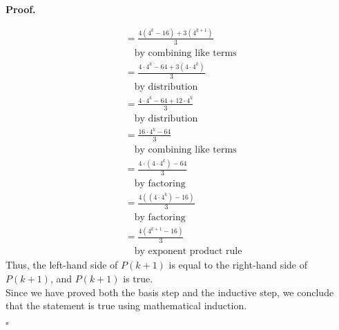\documentclass{article}
\newenvironment{proof}{
    \begin{mdframed}[nobreak=false, innerleftmargin=10pt, innerrightmargin=10pt, innertopmargin=10pt, innerbottommargin=10pt]
    \textbf{Proof.}
}{
    \hfill $\square$
    \end{mdframed}
}
\begin{document}
\begin{proof}
\begin{align*}
            &= \frac{4(4^k-16) + 3(4^{k+1})}{3} \\
            & \quad \text{by combining like terms} \\
            &= \frac{4 \cdot 4^k - 64 + 3(4 \cdot 4^k)}{3} \\
            & \quad \text{by distribution} \\
            &= \frac{4 \cdot 4^k - 64 + 12 \cdot 4^k}{3} \\
            & \quad \text{by distribution} \\
            &= \frac{16 \cdot 4^k - 64}{3} \\
            & \quad \text{by combining like terms} \\
            &= \frac{4 \cdot (4 \cdot 4^k) - 64}{3} \\
            & \quad \text{by factoring} \\
            &= \frac{4 ((4 \cdot 4^k) - 16)}{3} \\
            & \quad \text{by factoring} \\
            &= \frac{4 (4^{k+1} - 16)}{3} \\
            & \quad \text{by exponent product rule}
        \end{align*}
        Thus, the left-hand side of $P(k+1)$ is equal to the right-hand side of $P(k+1)$, and $P(k+1)$ is true. \\
        Since we have proved both the basis step and the inductive step, we conclude that the statement is true using mathematical induction.
    \end{proof}
\end{document}
